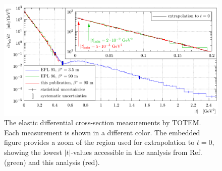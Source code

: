 \documentclass[doublecol]{epl/epl2}
\begin{document}
\begin{figure}
\hbox{}\vskip-8mm
\begin{center}
\includegraphics{fig/dsdt_comp.pdf}
\vskip-5mm
\caption{The elastic differential cross-section measurements by TOTEM. Each measurement is shown in a different color. The embedded figure provides a zoom of the region used for extrapolation to $t=0$, showing the lowest $|t|$-values accessible in the analysis from Ref.~\cite{epl96} (green) and this analysis (red).}
\label{fig:dsdt}
\end{center}
\vskip-15mm\hbox{}
\end{figure}
\end{document}

